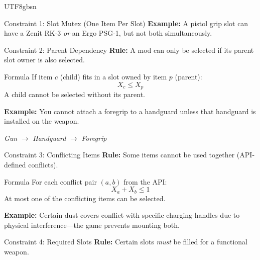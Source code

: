 \documentclass[aspectratio=169]{beamer}
\begin{document}
\begin{CJK*}{UTF8}{gbsn}
\begin{frame}{Constraint 1: Slot Mutex (One Item Per Slot)}
    \vspace{0.3cm}
    \textbf{Example:} A pistol grip slot can have a Zenit RK-3 \textit{or} an Ergo PSG-1, but not both simultaneously.
\end{frame}

\begin{frame}{Constraint 2: Parent Dependency}
    \textbf{Rule:} A mod can only be selected if its parent slot owner is also selected.

    \vspace{0.3cm}
    \begin{block}{Formula}
        If item $c$ (child) fits in a slot owned by item $p$ (parent):
        \[
        X_c \le X_p
        \]
        A child cannot be selected without its parent.
    \end{block}

    \vspace{0.3cm}
    \textbf{Example:} You cannot attach a foregrip to a handguard unless that handguard is installed on the weapon.

    \vspace{0.2cm}
    \begin{center}
    \textit{Gun} $\to$ \textit{Handguard} $\to$ \textit{Foregrip}
    \end{center}
\end{frame}

\begin{frame}{Constraint 3: Conflicting Items}
    \textbf{Rule:} Some items cannot be used together (API-defined conflicts).

    \vspace{0.3cm}
    \begin{block}{Formula}
        For each conflict pair $(a, b)$ from the API:
        \[
        X_a + X_b \le 1
        \]
        At most one of the conflicting items can be selected.
    \end{block}

    \vspace{0.3cm}
    \textbf{Example:} Certain dust covers conflict with specific charging handles due to physical interference---the game prevents mounting both.
\end{frame}

\begin{frame}{Constraint 4: Required Slots}
    \textbf{Rule:} Certain slots \textit{must} be filled for a functional weapon.


\end{frame}
\end{CJK*}
\end{document}
